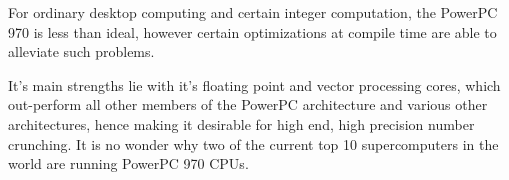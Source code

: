 \documentclass[a4paper,12pt]{article}
\begin{document}
For ordinary desktop computing and certain integer computation, the
PowerPC 970 is less than ideal, however certain optimizations at compile
time are able to alleviate such problems.


It's main strengths lie with it's floating point and vector processing
cores, which out-perform all other members of the PowerPC architecture and
various other architectures, hence making it desirable for high end, high
precision number crunching. It is no wonder why two of the current top
10 supercomputers in the world are running PowerPC 970 CPUs.


\end{document}
